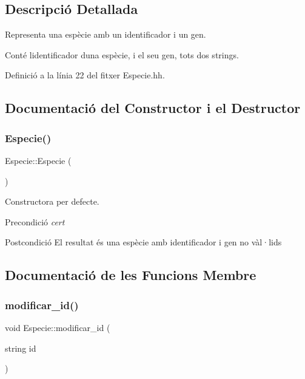 \subsection{Descripció Detallada}
Representa una espècie amb un identificador i un gen. 

Conté l\textquotesingle{}identificador d\textquotesingle{}una espècie, i el seu gen, tots dos strings. 

Definició a la línia 22 del fitxer Especie.\+hh.



\subsection{Documentació del Constructor i el Destructor}
\mbox{\label{class_especie_a272c2488719cc9874b2f174906675b3d}} 
\subsubsection{\texorpdfstring{Especie()}{Especie()}}
{\footnotesize\ttfamily Especie\+::\+Especie (\begin{DoxyParamCaption}{ }\end{DoxyParamCaption})}



Constructora per defecte. 

\begin{DoxyPrecond}{Precondició}
{\itshape cert} 
\end{DoxyPrecond}
\begin{DoxyPostcond}{Postcondició}
El resultat és una espècie amb identificador i gen no vàl·lids 
\end{DoxyPostcond}


\subsection{Documentació de les Funcions Membre}
\mbox{\label{class_especie_a28e9e87549c80a12d608328cf9d09e06}} 
\subsubsection{\texorpdfstring{modificar\+\_\+id()}{modificar\_id()}}
{\footnotesize\ttfamily void Especie\+::modificar\+\_\+id (\begin{DoxyParamCaption}\item[{string}]{id }\end{DoxyParamCaption})}



